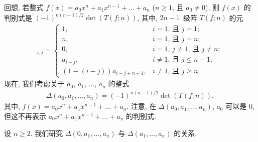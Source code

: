 \documentclass[../libro.tex]{subfiles}
\begin{document}
\begin{example}
    回想, 若整式
    \(f(x) = a_0 x^n + a_1 x^{n-1} + \dots + a_n\)
    (\(n \geq 1\), 且 \(a_0 \neq 0\)),
    则 \(f(x)\) 的判别式是
    \((-1)^{n(n-1)/2} \det {(T(f; n))}\),
    其中, \(2n-1\)~级阵 \(T(f; n)\) 的元
    \begin{align*}
        [T(f; n)]_{i,j} =
        \begin{cases}
            1,
            & \text{\(i = 1\), 且 \(j = 1\)}; \\
            n,
            & \text{\(i = 1\), 且 \(j = n\)}; \\
            0,
            & \text{\(i = 1\), \(j \neq 1\), 且 \(j \neq n\)}; \\
            a_{i-j},
            & \text{\(i \neq 1\), 且 \(j \leq n-1\)}; \\
            (1 - (i - j)) a_{i-j+n-1},
            & \text{\(i \neq 1\), 且 \(j \geq n\)}.
        \end{cases}
    \end{align*}
    现在, 我们考虑关于 \(a_0\), \(a_1\), \(\dots\), \(a_n\)
    的整式
    \begin{align*}
        \Delta (a_0, a_1, \dots, a_n)
        = (-1)^{n(n-1)/2} \det {(T(f; n))},
    \end{align*}
    其中, \(f(x) = a_0 x^n + a_1 x^{n-1} + \dots + a_n\).
    注意, 在 \(\Delta (a_0, a_1, \dots, a_n)\),
    \(a_0\) 可以是 \(0\),
    但这不再表示 \(a_0 x^n + a_1 x^{n-1} + \dots + a_n\)
    的判别式.

    设 \(n \geq 2\).
    我们研究 \(\Delta (0, a_1, \dots, a_n)\)
    与 \(\Delta (a_1, \dots, a_n)\) 的关系.


\end{example}
\end{document}
